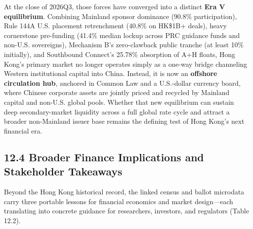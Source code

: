 \documentclass[11pt,letterpaper]{article}
\begin{document}
At the close of 2026Q3, those forces have converged into a distinct \textbf{Era V equilibrium}. Combining Mainland sponsor dominance (90.8\% participation), Rule 144A U.S. placement retrenchment (40.8\% on HK\$1B+ deals), heavy cornerstone pre-funding (41.4\% median lockup across PRC guidance funds and non-U.S. sovereigns), Mechanism B's zero-clawback public tranche (at least 10\% initially), and Southbound Connect's 25.78\% absorption of A+H floats, Hong Kong's primary market no longer operates simply as a one-way bridge channeling Western institutional capital into China. Instead, it is now an \textbf{offshore circulation hub}, anchored in Common Law and a U.S.-dollar currency board, where Chinese corporate assets are jointly priced and recycled by Mainland capital and non-U.S. global pools. Whether that new equilibrium can sustain deep secondary-market liquidity across a full global rate cycle and attract a broader non-Mainland issuer base remains the defining test of Hong Kong's next financial era.

\subsection*{\texorpdfstring{12.4 Broader Finance Implications and Stakeholder Takeaways}{12.4 Broader Finance Implications and Stakeholder Takeaways}}
Beyond the Hong Kong historical record, the linked census and ballot microdata carry three portable lessons for financial economics and market design—each translating into concrete guidance for researchers, investors, and regulators (Table 12.2).
\end{document}
